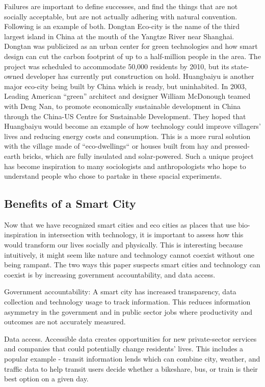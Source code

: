 Failures are important to define successes, and find the things that are not socially acceptable, but are not actually adhering with natural convention. Following is an example of both.	Dongtan Eco-city is the name of the third largest island in China at the mouth of the Yangtze River near Shanghai. Dongtan was publicized as an urban center for green technologies and how smart design can cut the carbon footprint of up to a half-million people in the area. The project was scheduled to accommodate 50,000 residents by 2010, but its state-owned developer has currently put construction on hold.  Huangbaiyu is another major eco-city being built by China which is ready, but uninhabited. In 2003, Leading American ``green'' architect and designer William McDonough teamed with Deng Nan, to promote economically sustainable development in China through the China-US Centre for Sustainable Development. They hoped that Huangbaiyu would become an example of how technology could improve villagers' lives and reducing energy costs and consumption. This is a more rural solution with the village made of ``eco-dwellings`` or houses built from hay and pressed-earth bricks, which are fully insulated and solar-powered.   Such a unique project has become inspiration to many sociologists and anthropologists who hope to understand people who chose to partake in these spacial experiments. 

\subsection{Benefits of a Smart City}

Now that we have recognized smart cities and eco cities as places that use bio-inspiration in intersection with technology, it is important to assess how this would transform our lives socially and physically. This is interesting because intuitively, it might seem like nature and technology cannot coexist without one being rampant. The two ways this paper suspects smart cities and technology can coexist is by increasing government accountability, and data access.

Government accountability: A smart city has increased transparency, data collection and technology usage to track information. This reduces information asymmetry in the government and in public sector jobs where productivity and outcomes are not accurately measured. 

Data access. Accessible data creates opportunities for new private-sector services and companies that could potentially change residents' lives. This includes a popular example - transit information lends which can combine city, weather, and traffic data to help transit users decide whether a bikeshare, bus, or train is their best option on a given day.

